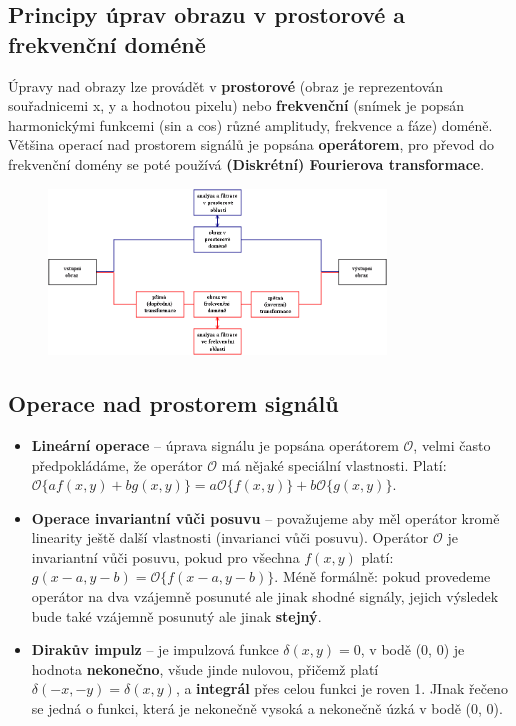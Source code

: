 \subsection{Principy úprav obrazu v prostorové a frekvenční doméně}
Úpravy nad obrazy lze provádět v \textbf{prostorové} (obraz je reprezentován souřadnicemi x, y a hodnotou pixelu) nebo \textbf{frekvenční} (snímek je popsán harmonickými funkcemi (sin a cos) různé amplitudy, frekvence a fáze) doméně. Většina operací nad prostorem signálů je popsána \textbf{operátorem}, pro převod do frekvenční domény se poté používá \textbf{(Diskrétní) Fourierova transformace}.

\begin{figure}[H]
	\centering
	\includegraphics[width=0.8\textwidth]{assets/7_signaly}
\end{figure}

\subsection{Operace nad prostorem signálů}
\begin{itemize}
\item \textbf{Lineární operace} -- úprava signálu je popsána operátorem $\mathcal{O}$, velmi často předpokládáme, že operátor $\mathcal{O}$ má nějaké speciální vlastnosti. Platí: $\mathcal{O}\{af(x, y) + bg(x, y)\} = a\mathcal{O}\{f(x, y)\} + b\mathcal{O}\{g(x, y)\}$.
\item \textbf{Operace invariantní vůči posuvu} -- považujeme aby měl operátor kromě linearity ještě další vlastnosti (invarianci vůči posuvu). Operátor $\mathcal{O}$ je invariantní vůči posuvu, pokud pro všechna $f(x, y)$ platí: $g(x - a, y -b) = \mathcal{O}\{f(x-a, y-b)\}$. Méně formálně: pokud provedeme operátor na dva vzájemně posunuté ale jinak shodné signály, jejich výsledek bude také vzájemně posunutý ale jinak \textbf{stejný}.
\item \textbf{Dirakův impulz} -- je impulzová funkce $\delta(x, y) = 0$, v bodě (0, 0) je hodnota \textbf{nekonečno}, všude jinde nulovou, přičemž platí $\delta(-x, -y) = \delta(x, y)$, a \textbf{integrál} přes celou funkci je roven 1. JInak řečeno se jedná o funkci, která je nekonečně vysoká a nekonečně úzká v bodě (0, 0).
\end{itemize}

